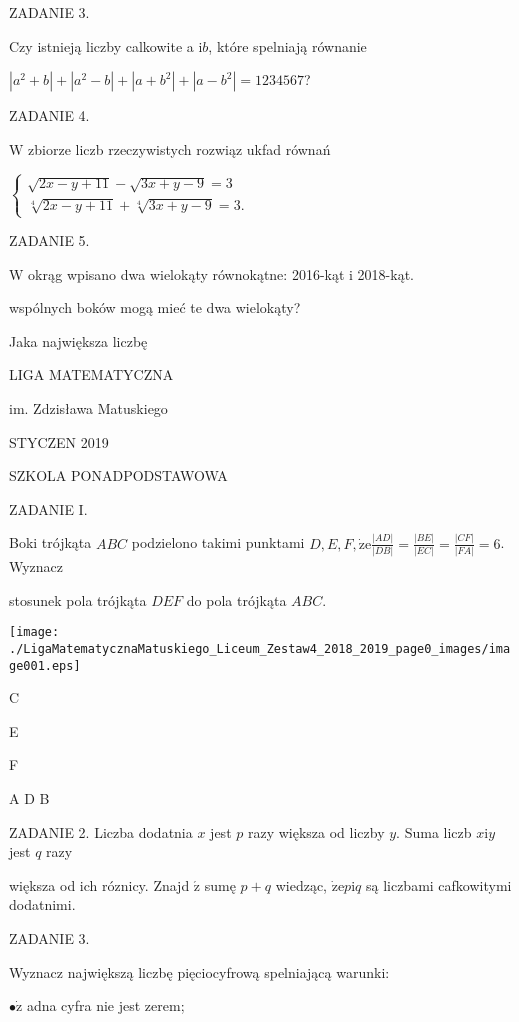 \documentclass[a4paper,12pt]{article}
\begin{document}
ZADANIE 3.

Czy istnieją liczby calkowite a $\mathrm{i}b$, które spelniają równanie

$|a^{2}+b|+|a^{2}-b|+|a+b^{2}|+|a-b^{2}|=1234567$?

ZADANIE 4.

$\mathrm{W}$ zbiorze liczb rzeczywistych rozwiąz ukfad równań

$\left\{\begin{array}{l}
\sqrt{2x-y+11}-\sqrt{3x+y-9}=3\\
\sqrt[4]{2x-y+11}+\sqrt[4]{3x+y-9}=3.
\end{array}\right.$

ZADANIE 5.

W okrąg wpisano dwa wielokąty równokątne: 2016-kąt i 2018-kąt.

wspólnych boków mogą mieć te dwa wielokąty?

Jaka największa liczbę






LIGA MATEMATYCZNA

im. Zdzisława Matuskiego

STYCZEN 2019

SZKOLA PONADPODSTAWOWA

ZADANIE I.

Boki trójkąta $ABC$ podzielono takimi punktami $D, E, F, \displaystyle \dot{\mathrm{z}}\mathrm{e}\frac{|AD|}{|DB|}=\frac{|BE|}{|EC|}=\frac{|CF|}{|FA|}=6$. Wyznacz

stosunek pola trójkąta $DEF$ do pola trójkąta $ABC.$
\begin{center}
\texttt{[image: ./LigaMatematycznaMatuskiego\_Liceum\_Zestaw4\_2018\_2019\_page0\_images/image001.eps]}
\end{center}
C

E

F

A  D  B

ZADANIE 2. Liczba dodatnia $x$ jest $p$ razy większa od liczby $y$. Suma liczb $x\mathrm{i}y$ jest $q$ razy

większa od ich róznicy. Znajd $\acute{\mathrm{z}}$ sumę $p+q$ wiedząc, $\dot{\mathrm{z}}\mathrm{e}p\mathrm{i}q$ są liczbami cafkowitymi dodatnimi.

ZADANIE 3.

Wyznacz największą liczbę pięciocyfrową spelniającą warunki:

$\bullet \dot{\mathrm{z}}$ adna cyfra nie jest zerem;
\end{document}
